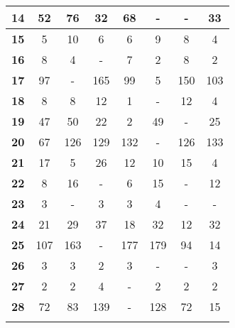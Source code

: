 \documentclass{singlecol-new}
\begin{document}
\begin{table}[!ht]
{\begin{tabular}{cccccccc}
\hline
  {\bf 14} &         52 &   \cellcolor[gray]{.6} 76 &         32 &         68 &          - &          - &        \cellcolor[gray]{.8} 33 \\
\hline
  {\bf 15} &          5 &         10 &    \cellcolor[gray]{.6} 6 &          6 &          9 &          8 &         \cellcolor[gray]{.8} 4 \\
\hline
  {\bf 16} &          8 &          4 &          - &          7 &          2 &    \cellcolor[gray]{.6} 8 &         \cellcolor[gray]{.8} 2 \\
\hline
  {\bf 17} &         97 &          - &        165 &         99 &         \cellcolor[gray]{.8} 5 &  \cellcolor[gray]{.6} 150 &        103 \\
\hline
  {\bf 18} &          8 &          8 &   \cellcolor[gray]{.6} 12 &          1 &          - &         12 &         \cellcolor[gray]{.8} 4 \\
\hline
  {\bf 19} &         47 &         50 &   \cellcolor[gray]{.6} 22 &         \cellcolor[gray]{.8} 2 &         49 &          - &         25 \\
\hline
  {\bf 20} &         67 &  \cellcolor[gray]{.6} 126 &        129 &       \cellcolor[gray]{.8} 132 &          - &        126 &        133 \\
\hline
  {\bf 21} &         17 &          5 &         26 &         12 &         10 &   \cellcolor[gray]{.6} 15 &         \cellcolor[gray]{.8} 4 \\
\hline
  {\bf 22} &          8 &   \cellcolor[gray]{.6} 16 &          - &          6 &         15 &          - &        \cellcolor[gray]{.8} 12 \\
\hline
  {\bf 23} &          3 &          - &    \cellcolor[gray]{.6} 3 &          3 &         \cellcolor[gray]{.8} 4 &          - &          - \\
\hline
  {\bf 24} &         21 &         29 &         37 &         18 &         32 &   \cellcolor[gray]{.6} 12 &        \cellcolor[gray]{.8} 32 \\
\hline
  {\bf 25} &        107 &        163 &          - &        177 &        179 &   \cellcolor[gray]{.6} 94 &        \cellcolor[gray]{.8} 14 \\
\hline
  {\bf 26} &          3 &          3 &    \cellcolor[gray]{.6} 2 &          3 &          - &          - &         \cellcolor[gray]{.8} 3 \\
\hline
  {\bf 27} &          2 &          2 &          4 &          - &          2 &    \cellcolor[gray]{.6} 2 &         \cellcolor[gray]{.8} 2 \\
\hline
  {\bf 28} &         72 &         83 &        139 &          - &        128 &   \cellcolor[gray]{.6} 72 &        \cellcolor[gray]{.8} 15 \\
\hline
    {\bf } &     {\bf } &     {\bf } &     {\bf } &     {\bf } &     {\bf } &     {\bf } &     {\bf } \\


\end{tabular}}
\end{table}
\end{document}
